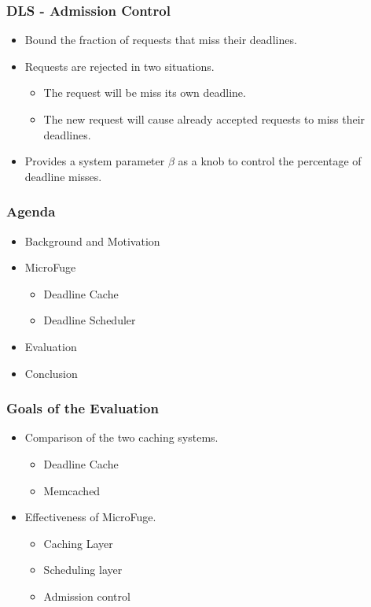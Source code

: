 \documentclass{beamer}
\begin{document}
\begin{frame}
  \frametitle{DLS - Admission Control}
  \begin{itemize}
  \item Bound the fraction of requests that miss their deadlines.
  \item Requests are rejected in two situations.
    \begin{itemize}
      \item The request will be miss its own deadline.
      \item The new request will cause already accepted requests to miss their deadlines.
    \end{itemize}
  \item Provides a system parameter $\beta$ as a knob to control the percentage
    of deadline misses.
  \end{itemize}
\end{frame}


\begin{frame}
  \frametitle{Agenda}
  \begin{itemize}
  \item[\Checkmark] Background and Motivation
  \item[\Checkmark] MicroFuge
    \begin{itemize}
    \item[\Checkmark] Deadline Cache
    \item[\Checkmark] Deadline Scheduler
    \end{itemize}
  \item Evaluation
  \item Conclusion
  \end{itemize}
\end{frame}

\begin{frame}
  \frametitle{Goals of the Evaluation}
  \begin{itemize}
    \item Comparison of the two caching systems.
      \begin{itemize}
        \item Deadline Cache
        \item Memcached
      \end{itemize}
    \item Effectiveness of MicroFuge.
      \begin{itemize}
      \item Caching Layer
      \item Scheduling layer
      \item Admission control
  \end{itemize}
  \end{itemize}
\end{frame}
\end{document}
